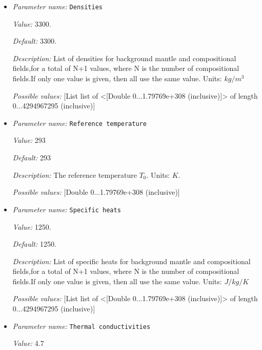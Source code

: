 \begin{itemize}
\item {\it Parameter name:} {\tt Densities}
\label{parameters:Material model/Multicomponent/Densities}


{\it Value:} 3300.


{\it Default:} 3300.


{\it Description:} List of densities for background mantle and compositional fields,for a total of N+1 values, where N is the number of compositional fields.If only one value is given, then all use the same value.  Units: $kg / m^3$


{\it Possible values:} [List list of <[Double 0...1.79769e+308 (inclusive)]> of length 0...4294967295 (inclusive)]
\item {\it Parameter name:} {\tt Reference temperature}
\label{parameters:Material model/Multicomponent/Reference temperature}


{\it Value:} 293


{\it Default:} 293


{\it Description:} The reference temperature $T_0$. Units: $K$.


{\it Possible values:} [Double 0...1.79769e+308 (inclusive)]
\item {\it Parameter name:} {\tt Specific heats}
\label{parameters:Material model/Multicomponent/Specific heats}


{\it Value:} 1250.


{\it Default:} 1250.


{\it Description:} List of specific heats for background mantle and compositional fields,for a total of N+1 values, where N is the number of compositional fields.If only one value is given, then all use the same value. Units: $J /kg /K$


{\it Possible values:} [List list of <[Double 0...1.79769e+308 (inclusive)]> of length 0...4294967295 (inclusive)]
\item {\it Parameter name:} {\tt Thermal conductivities}
\label{parameters:Material model/Multicomponent/Thermal conductivities}


{\it Value:} 4.7



\end{itemize}
